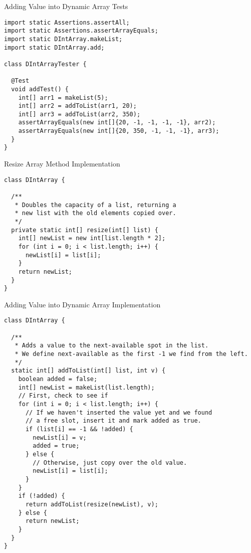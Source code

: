 \begin{cl}[]{Adding Value into Dynamic Array Tests}
\begin{lstlisting}[language=MyJava]
import static Assertions.assertAll;
import static Assertions.assertArrayEquals;
import static DIntArray.makeList;
import static DIntArray.add;

class DIntArrayTester {

  @Test
  void addTest() {
    int[] arr1 = makeList(5);
    int[] arr2 = addToList(arr1, 20);
    int[] arr3 = addToList(arr2, 350);
    assertArrayEquals(new int[]{20, -1, -1, -1, -1}, arr2);
    assertArrayEquals(new int[]{20, 350, -1, -1, -1}, arr3);
  }
}
\end{lstlisting}
\end{cl}

\begin{cl}[]{Resize Array Method Implementation}
\begin{lstlisting}[language=MyJava]
class DIntArray {

  /**
   * Doubles the capacity of a list, returning a 
   * new list with the old elements copied over.
   */
  private static int[] resize(int[] list) {
    int[] newList = new int[list.length * 2];
    for (int i = 0; i < list.length; i++) {
      newList[i] = list[i];
    }
    return newList;
  }
}
\end{lstlisting}
\end{cl}

\begin{cl}[]{Adding Value into Dynamic Array Implementation}
\begin{lstlisting}[language=MyJava]
class DIntArray {

  /**
   * Adds a value to the next-available spot in the list.
   * We define next-available as the first -1 we find from the left.
   */
  static int[] addToList(int[] list, int v) {
    boolean added = false;
    int[] newList = makeList(list.length);
    // First, check to see if 
    for (int i = 0; i < list.length; i++) {
      // If we haven't inserted the value yet and we found
      // a free slot, insert it and mark added as true.
      if (list[i] == -1 && !added) {
        newList[i] = v;
        added = true;
      } else {
        // Otherwise, just copy over the old value.
        newList[i] = list[i];
      }
    }
    if (!added) {
      return addToList(resize(newList), v);
    } else {
      return newList;
    }
  }
}
\end{lstlisting}
\end{cl}


